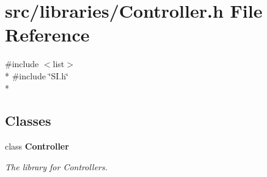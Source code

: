 \section{src/libraries/\-Controller.h File Reference}
\label{_controller_8h}
{\ttfamily \#include $<$list$>$}\\*
{\ttfamily \#include \char`\"{}S\-I.\-h\char`\"{}}\\*
\subsection*{Classes}
\begin{DoxyCompactItemize}
\item 
class {\bf Controller}
\begin{DoxyCompactList}\small\item\em The library for Controllers. \end{DoxyCompactList}\end{DoxyCompactItemize}

